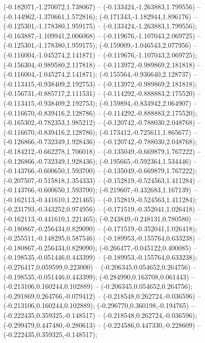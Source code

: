  (-0.182071,-1.270072,1.738067) -- (-0.133424,-1.263883,1.799556) -- (-0.144962,-1.370661,1.572816);
 (-0.171343,-1.182944,1.896176) -- (-0.125301,-1.178380,1.959175) -- (-0.133424,-1.263883,1.799556);
 (-0.163887,-1.109941,2.006068) -- (-0.119676,-1.107043,2.069725) -- (-0.125301,-1.178380,1.959175);
 (-0.159009,-1.046543,2.077956) -- (-0.116004,-1.045274,2.141871) -- (-0.119676,-1.107043,2.069725);
 (-0.156304,-0.989580,2.117818) -- (-0.113972,-0.989869,2.181818) -- (-0.116004,-1.045274,2.141871);
 (-0.155564,-0.936640,2.128737) -- (-0.113415,-0.938409,2.192753) -- (-0.113972,-0.989869,2.181818);
 (-0.156731,-0.885717,2.111531) -- (-0.114292,-0.888883,2.175520) -- (-0.113415,-0.938409,2.192753);
 (-0.159894,-0.834942,2.064907) -- (-0.116670,-0.839416,2.128786) -- (-0.114292,-0.888883,2.175520);
 (-0.165302,-0.782353,1.985212) -- (-0.120742,-0.788030,2.048768) -- (-0.116670,-0.839416,2.128786);
 (-0.173412,-0.725611,1.865677) -- (-0.126866,-0.732349,1.928436) -- (-0.120742,-0.788030,2.048768);
 (-0.184212,-0.662278,1.706018) -- (-0.135049,-0.669879,1.767222) -- (-0.126866,-0.732349,1.928436);
 (-0.195665,-0.592364,1.534446) -- (-0.143766,-0.600650,1.593700) -- (-0.135049,-0.669879,1.767222);
 (-0.207507,-0.515818,1.354333) -- (-0.152819,-0.524563,1.411284) -- (-0.143766,-0.600650,1.593700);
 (-0.219607,-0.432683,1.167139) -- (-0.162113,-0.441610,1.221465) -- (-0.152819,-0.524563,1.411284);
 (-0.231793,-0.343252,0.974956) -- (-0.171519,-0.352041,1.026418) -- (-0.162113,-0.441610,1.221465);
 (-0.243849,-0.248131,0.780580) -- (-0.180867,-0.256434,0.829090) -- (-0.171519,-0.352041,1.026418);
 (-0.255511,-0.148295,0.587546) -- (-0.189953,-0.155764,0.633238) -- (-0.180867,-0.256434,0.829090);
 (-0.266477,-0.045122,0.400085) -- (-0.198535,-0.051446,0.443399) -- (-0.189953,-0.155764,0.633238);
 (-0.276417,0.059599,0.223000) -- (-0.206345,0.054652,0.264756) -- (-0.198535,-0.051446,0.443399);
 (-0.284990,0.163708,0.061443) -- (-0.213106,0.160244,0.102889) -- (-0.206345,0.054652,0.264756);
 (-0.291869,0.264766,-0.079412) -- (-0.218548,0.262724,-0.036596) -- (-0.213106,0.160244,0.102889);
 (-0.296770,0.360198,-0.194765) -- (-0.222435,0.359325,-0.148517) -- (-0.218548,0.262724,-0.036596);
 (-0.299479,0.447480,-0.280613) -- (-0.224586,0.447330,-0.228609) -- (-0.222435,0.359325,-0.148517);
